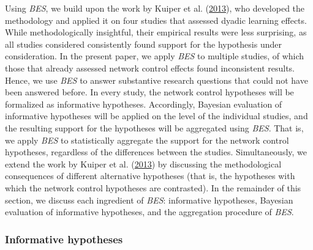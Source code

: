 \documentclass[
  11pt,
]{article}
\begin{document}
Using \emph{BES}, we build upon the work by Kuiper et al. (\protect\hyperlink{ref-kuiper_combining_2013}{2013}), who developed the methodology and applied it on four studies that assessed dyadic learning effects.
While methodologically insightful, their empirical results were less surprising, as all studies considered consistently found support for the hypothesis under consideration.
In the present paper, we apply \emph{BES} to multiple studies, of which those that already assessed network control effects found inconsistent results.
Hence, we use \emph{BES} to answer substantive research questions that could not have been answered before.
In every study, the network control hypotheses will be formalized as informative hypotheses.
Accordingly, Bayesian evaluation of informative hypotheses will be applied on the level of the individual studies, and the resulting support for the hypotheses will be aggregated using \emph{BES}.
That is, we apply \emph{BES} to statistically aggregate the support for the network control hypotheses, regardless of the differences between the studies.
Simultaneously, we extend the work by Kuiper et al. (\protect\hyperlink{ref-kuiper_combining_2013}{2013}) by discussing the methodological consequences of different alternative hypotheses (that is, the hypotheses with which the network control hypotheses are contrasted).
In the remainder of this section, we discuss each ingredient of \emph{BES}: informative hypotheses, Bayesian evaluation of informative hypotheses, and the aggregation procedure of \emph{BES}.

\hypertarget{informative-hypotheses}{%
\subsubsection{Informative hypotheses}\label{informative-hypotheses}}
\end{document}
